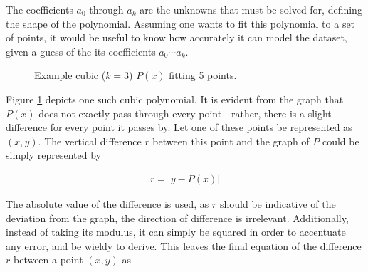 \documentclass[12pt, a4paper]{article}
\begin{document}
The coefficients $a_0$ through $a_k$ are the unknowns that must be solved for,
defining the shape of the polynomial. Assuming one wants to fit this polynomial
to a set of points, it would be useful to know how accurately it can model the
dataset, given a guess of the its coefficients $a_0 \cdots a_k$.

\begin{figure}[H]
    \centering
    \caption{
        Example cubic ($k=3$) $P(x)$ fitting 5 points.
    }
    \label{fig1}
\end{figure}

Figure \ref{fig1} depicts one such cubic polynomial. It is evident from the
graph that $P(x)$ does not exactly pass through every point - rather, there is a
slight difference for every point it passes by. Let one of these points be
represented as $(x, y)$. The vertical difference $r$ between this point and the
graph of $P$ could be simply represented by

\begin{align*}
    r=|y-P(x)|
\end{align*}

The absolute value of the difference is used, as $r$ should be indicative of the
deviation from the graph, the direction of difference is irrelevant.
Additionally, instead  of taking its modulus, it can simply be squared in order
to accentuate any error, and be wieldy to derive.  This leaves the final
equation of the difference $r$ between a point $(x, y)$ as
\end{document}
